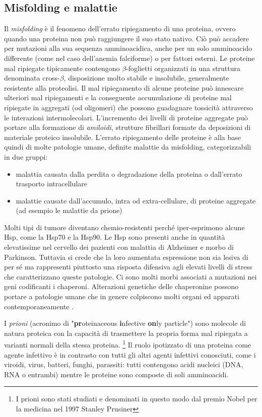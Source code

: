 {\subsection{Misfolding e malattie}
{
Il \textit{misfolding} è il fenomeno dell'errato ripiegamento di una proteina, ovvero quando una proteina non può raggiungere il suo stato nativo. Ciò può accadere per mutazioni alla sua sequenza amminoacidica, anche per un solo amminoacido differente (come nel caso dell'anemia falciforme) o per fattori esterni. Le proteine mal ripiegate tipicamente contengono $\beta$-foglietti organizzati in una struttura denominata cross-$\beta$, disposizione molto stabile e insolubile, generalmente resistente alla proteolisi. Il mal ripiegamento di alcune proteine può innescare ulteriori mal ripiegamenti e la conseguente accumulazione di proteine mal ripiegate in aggregati (od oligomeri) che possono guadagnare tossicità attraverso le interazioni intermolecolari. L'incremento dei livelli di proteine aggregate può portare alla formazione di \textit{amiloidi}, strutture fibrillari formate da deposizioni di materiale proteico insolubile. L'errato ripiegamento delle proteine è alla base quindi di molte patologie umane, definite malattie da misfolding, categorizzabili in due gruppi:

\begin{itemize}
	\item malattia causata dalla perdita o degradazione della proteina o dall'errato trasporto intracellulare
	\item malattie causate dall'accumulo, intra od extra-cellulare, di proteine aggregate (ad esempio le malattie da prione)
\end{itemize}

Molti tipi di tumore diventano chemio-resistenti perché iper-esprimono alcune Hsp, come la Hsp70 e la Hsp90. Le Hsp sono presenti anche in quantità elevatissime nel cervello dei pazienti con malattia di Alzheimer e morbo di Parkinson. Tuttavia si crede che la loro aumentata espressione non sia lesiva di per sé ma rappresenti piuttosto una risposta difensiva agli elevati livelli di stress che caratterizzano queste patologie. Ci sono molti morbi associati a mutazioni nei geni codificanti i chaperoni. Alterazioni genetiche delle chaperonine possono portare a patologie umane che in genere colpiscono molti organi ed apparati contemporaneamente \supercite{chaperoninaWiki}. \\

\par I \textit{prioni} (acronimo di "\textbf{pr}oteinaceous \textbf{i}nfective \textbf{on}ly particle") sono molecole di natura proteica con la capacità di trasmettere la propria forma mal ripiegata a varianti normali della stessa proteina. \footnote{I prioni sono stati studiati e denominati in questo modo dal premio Nobel per la medicina nel 1997 Stanley Prusiner\supercite{prusiner1998prion}} Il ruolo ipotizzato di una proteina come agente infettivo è in contrasto con tutti gli altri agenti infettivi conosciuti, come i viroidi, virus, batteri, funghi, parassiti: tutti contengono acidi nucleici (DNA, RNA o entrambi) mentre le proteine sono composte di soli amminoacidi.

}}
